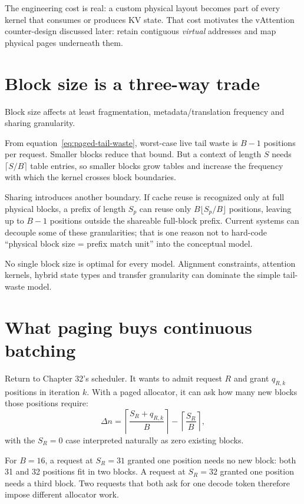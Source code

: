 The engineering cost is real: a custom physical layout becomes part of every
kernel that consumes or produces KV state. That cost motivates the vAttention
counter-design discussed later: retain contiguous \emph{virtual} addresses and
map physical pages underneath them.

\section{Block size is a three-way trade}

Block size affects at least fragmentation, metadata/translation frequency and
sharing granularity.

From equation~\eqref{eq:paged-tail-waste}, worst-case live tail waste is
$B-1$ positions per request. Smaller blocks reduce that bound. But a context
of length $S$ needs $\lceil S/B\rceil$ table entries, so smaller blocks grow
tables and increase the frequency with which the kernel crosses block
boundaries.

Sharing introduces another boundary. If cache reuse is recognized only at
full physical blocks, a prefix of length $S_p$ can reuse only
$B\lfloor S_p/B\rfloor$ positions, leaving up to $B-1$ positions outside the
shareable full-block prefix. Current systems can decouple some of these
granularities; that is one reason not to hard-code ``physical block size =
prefix match unit'' into the conceptual model.

No single block size is optimal for every model. Alignment constraints,
attention kernels, hybrid state types and transfer granularity can dominate
the simple tail-waste model.

\section{What paging buys continuous batching}

Return to Chapter 32's scheduler. It wants to admit request $R$ and grant
$q_{R,k}$ positions in iteration $k$. With a paged allocator, it can ask how
many new blocks those positions require:
\begin{equation}
\Delta n =
\left\lceil\frac{S_R+q_{R,k}}{B}\right\rceil
-\left\lceil\frac{S_R}{B}\right\rceil,
\label{eq:paged-increment}
\end{equation}
with the $S_R=0$ case interpreted naturally as zero existing blocks.

For $B=16$, a request at $S_R=31$ granted one position needs no new block:
both 31 and 32 positions fit in two blocks. A request at $S_R=32$ granted one
position needs a third block. Two requests that both ask for one decode token
therefore impose different allocator work.

